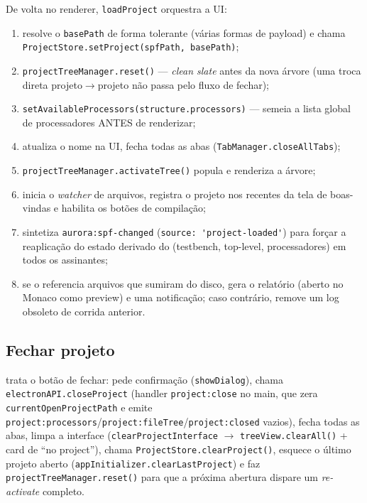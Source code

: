 De volta no renderer, \lstinline|loadProject| orquestra a UI:

\begin{enumerate}[leftmargin=1.8em]
  \item resolve o \lstinline|basePath| de forma tolerante (várias formas de
    payload) e chama \lstinline|ProjectStore.setProject(spfPath, basePath)|;
  \item \lstinline|projectTreeManager.reset()| — \emph{clean slate} antes da
    nova árvore (uma troca direta projeto$\rightarrow$projeto não passa pelo
    fluxo de fechar);
  \item \lstinline|setAvailableProcessors(structure.processors)| — semeia a
    lista global de processadores ANTES de renderizar;
  \item atualiza o nome na UI, fecha todas as abas
    (\lstinline|TabManager.closeAllTabs|);
  \item \lstinline|projectTreeManager.activateTree()| popula e renderiza a
    árvore;
  \item inicia o \emph{watcher} de arquivos, registra o projeto nos recentes da
    tela de boas-vindas e habilita os botões de compilação;
  \item sintetiza \lstinline|aurora:spf-changed| (\lstinline|source: 'project-loaded'|)
    para forçar a reaplicação do estado derivado do  (testbench,
    top-level, processadores) em todos os assinantes;
  \item se o  referencia arquivos que sumiram do disco, gera o
    relatório  (aberto no Monaco como preview) e
    uma notificação; caso contrário, remove um log obsoleto de corrida anterior.
\end{enumerate}

\subsection{Fechar projeto}

 trata o botão de fechar: pede confirmação
(\lstinline|showDialog|), chama \lstinline|electronAPI.closeProject| (handler
\lstinline|project:close| no main, que zera \lstinline|currentOpenProjectPath| e
emite \lstinline|project:processors|/\lstinline|project:fileTree|/\lstinline|project:closed|
vazios), fecha todas as abas, limpa a interface
(\lstinline|clearProjectInterface| $\rightarrow$ \lstinline|treeView.clearAll()|
+ card de \enquote{no project}), chama \lstinline|ProjectStore.clearProject()|,
esquece o último projeto aberto (\lstinline|appInitializer.clearLastProject|) e
faz \lstinline|projectTreeManager.reset()| para que a próxima abertura dispare
um \emph{re-activate} completo.

